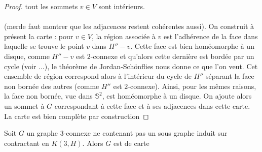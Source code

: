 \documentclass{scrartcl}
\begin{document}
\begin{flushleft}
\begin{proof}
    tout les sommets $v \in V$ sont intérieurs.
    \\~\\
    (merde faut montrer que les adjacences restent cohérentes aussi).
    On construit à présent la carte : pour $v \in V$, la région associée à $v$ est l'adhérence de la face dans laquelle se trouve
    le point $v$ dans $H'' - v$. Cette face est bien homéomorphe à un disque, comme $H'' - v$ est $2$-connexe et qu'alors
    cette dernière est bordée par un cycle (voir ...), le théorème de Jordan-Schönflies nous donne ce que l'on veut.
    Cet ensemble de région correspond alors à l'intérieur du cycle de $H''$
    séparant la face non bornée des autres (comme $H''$ est $2$-connexe). Ainsi, pour les mêmes raisons, la face non bornée, vue dans $\mathbb{S}^2$,
    est homéomorphe à un disque. On ajoute alors un sommet à $G$ correspondant à cette face et à ses adjacences dans cette carte.
    La carte est bien complète par construction

\end{proof}

\begin{lem}
    Soit $G$ un graphe $3$-connexe ne contenant pas un sous graphe induit sur contractant en $K(3, H)$. Alors $G$ est de carte
\end{lem}


\end{flushleft}
\end{document}
